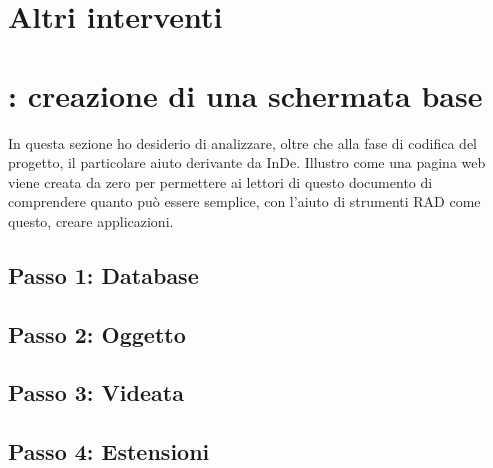 \section{Altri interventi}

\section{\inde: creazione di una schermata base}
In questa sezione ho desiderio di analizzare, oltre che alla fase di codifica del progetto, il particolare aiuto derivante da InDe. Illustro come una pagina web viene creata da zero per permettere ai lettori di questo documento di comprendere quanto può essere semplice, con l'aiuto di strumenti RAD come questo, creare applicazioni.

\subsection{Passo 1: Database}
\subsection{Passo 2: Oggetto}
\subsection{Passo 3: Videata}
\subsection{Passo 4: Estensioni}



